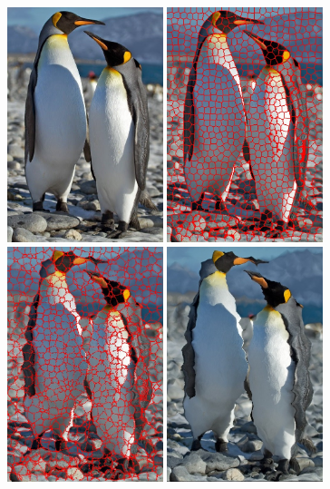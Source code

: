 \begin{figure}[htbp] \centering
\includegraphics[height=2.7in]{images/penguin-pipe-1.jpg}
\includegraphics[height=2.7in]{images/penguin-pipe-2.jpg}
\includegraphics[height=2.7in]{images/penguin-pipe-3.jpg}\vspace{1.1mm}
\includegraphics[height=2.7in]{images/penguin-pipe-4.jpg}

\end{figure}
